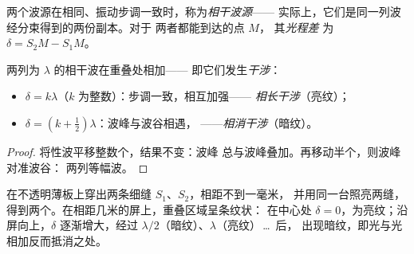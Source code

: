 \begin{definition}\label{def:g12:light-as-wave:coherent}
两个波源在相同、振动步调一致时，称为\emph{相干波源}——
实际上，它们是同一列波经分束得到的两份副本。对于
两者都能到达的点 $M$，
其\emph{光程差}%
为 $\delta = S_2M - S_1M$。
\end{definition}

\begin{proposition}[干涉条件]\label{prop:g12:light-as-wave:conditions}
两列为 $\lambda$ 的相干波在重叠处相加——
即它们发生\emph{干涉}：
\begin{itemize}
  \item $\delta = k\lambda$（$k$ 为整数）：步调一致，相互加强——
        \emph{相长干涉}（亮纹）；
  \item $\delta = (k + \tfrac12)\lambda$：波峰与波谷相遇，
        ——\emph{相消干涉}（暗纹）。
\end{itemize}
\end{proposition}

\begin{proof}
将性波平移整数个，结果不变：波峰
总与波峰叠加。再移动半个，则波峰对准波谷：
两列等幅波。
\end{proof}

\begin{example}[杨氏双缝实验]\label{ex:g12:light-as-wave:young}
在不透明薄板上穿出两条细缝 $S_1$、$S_2$，相距不到一毫米，
并用同一台照亮两缝，得到两个。在相距几米的屏上，重叠区域呈条纹状：
在中心处 $\delta = 0$，为亮纹；沿屏向上，$\delta$
逐渐增大，经过 $\lambda/2$（暗纹）、$\lambda$（亮纹）\,\dots\ 后，
出现暗纹，即光与光相加反而抵消之处。
\end{example}


